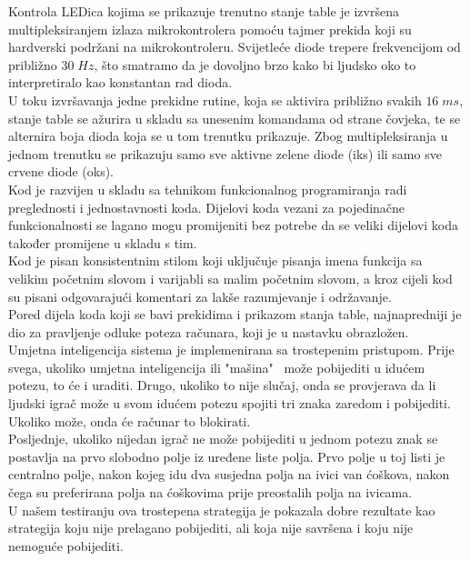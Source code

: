 \documentclass[journal]{IEEE_JAIC}
\begin{document}
Kontrola LEDica kojima se prikazuje trenutno stanje table je izvršena multipleksiranjem izlaza mikrokontrolera pomoću tajmer prekida koji su hardverski podržani na mikrokontroleru. Svijetleće diode trepere frekvencijom od približno $30 \; Hz$, što smatramo da je dovoljno brzo kako bi ljudsko oko to interpretiralo kao konstantan rad dioda.\\

U toku izvršavanja jedne prekidne rutine, koja se aktivira približno svakih $16 \; ms$, stanje table se ažurira u skladu sa unesenim komandama od strane čovjeka, te se alternira boja dioda koja se u tom trenutku prikazuje. Zbog multipleksiranja u jednom trenutku se prikazuju samo sve aktivne zelene diode (iks) ili samo sve crvene diode (oks).\\

Kod je razvijen u skladu sa tehnikom funkcionalnog programiranja radi preglednosti i jednostavnosti koda. Dijelovi koda vezani za pojedinačne funkcionalnosti se lagano mogu promijeniti bez potrebe da se veliki dijelovi koda također promijene u skladu s tim.\\

Kod je pisan konsistentnim stilom koji uključuje pisanja imena funkcija sa velikim početnim slovom i varijabli sa malim početnim slovom, a kroz cijeli kod su pisani odgovarajući komentari za lakše razumjevanje i održavanje.\\

Pored dijela koda koji se bavi prekidima i prikazom stanja table, najnapredniji je dio za pravljenje odluke poteza računara, koji je u nastavku obrazložen. \\

Umjetna inteligencija sistema je implemenirana sa trostepenim pristupom. Prije svega, ukoliko umjetna inteligencija ili "mašina" $\,$ može pobijediti u idućem potezu, to će i uraditi. Drugo, ukoliko to nije slučaj, onda se provjerava da li ljudski igrač može u svom idućem potezu spojiti tri znaka zaredom i pobijediti. Ukoliko može, onda će računar to blokirati.\\

Posljednje, ukoliko nijedan igrač ne može pobijediti u jednom potezu znak se postavlja na prvo slobodno polje iz uređene liste polja. Prvo polje u toj listi je centralno polje, nakon kojeg idu dva susjedna polja na ivici van ćoškova, nakon čega su preferirana polja na ćoškovima prije preostalih polja na ivicama.\\

U našem testiranju ova trostepena strategija je pokazala dobre rezultate kao strategija koju nije prelagano pobijediti, ali koja nije savršena i koju nije nemoguće pobijediti. \\
\end{document}
